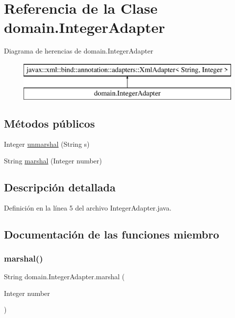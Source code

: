 \hypertarget{classdomain_1_1IntegerAdapter}{}\section{Referencia de la Clase domain.\+Integer\+Adapter}
\label{classdomain_1_1IntegerAdapter}
Diagrama de herencias de domain.\+Integer\+Adapter\begin{figure}[H]
\begin{center}
\leavevmode
\includegraphics[height=2.000000cm]{classdomain_1_1IntegerAdapter}
\end{center}
\end{figure}
\subsection*{Métodos públicos}
\begin{DoxyCompactItemize}
\item 
Integer \mbox{\hyperlink{classdomain_1_1IntegerAdapter_ad2bfc5af140573682dd03906b9264b51}{unmarshal}} (String s)
\item 
String \mbox{\hyperlink{classdomain_1_1IntegerAdapter_a407b4872b78e54ed80c9ae597cae2451}{marshal}} (Integer number)
\end{DoxyCompactItemize}


\subsection{Descripción detallada}


Definición en la línea 5 del archivo Integer\+Adapter.\+java.



\subsection{Documentación de las funciones miembro}
\mbox{\label{classdomain_1_1IntegerAdapter_a407b4872b78e54ed80c9ae597cae2451}} 
\subsubsection{\texorpdfstring{marshal()}{marshal()}}
{\footnotesize\ttfamily String domain.\+Integer\+Adapter.\+marshal (\begin{DoxyParamCaption}\item[{Integer}]{number }\end{DoxyParamCaption})}



